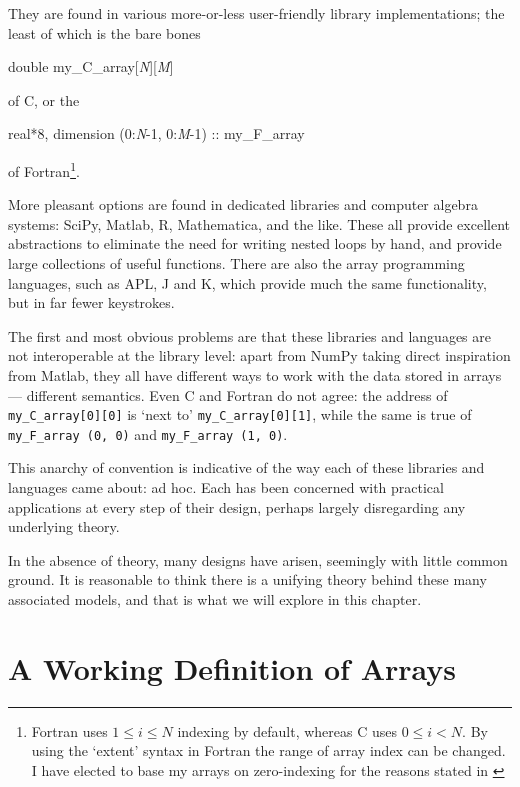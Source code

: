 \documentclass{DIKU-report-variant}
\begin{document}
They are found in various more-or-less user-friendly library implementations;
the least of which is the bare bones
\begin{center}
\ttfamily double my\_C\_array[\textit{N}][\textit{M}]
\end{center}
of C, or the
\begin{center}
\ttfamily real*8, dimension (0:\textit{N}-1, 0:\textit{M}-1) :: my\_F\_array
\end{center}
of Fortran\footnote{Fortran uses \(1\le i\le N\) indexing by default, whereas C uses \(0\le i<N\).
By using the `extent' syntax in Fortran the range of array index can be changed. I have elected
to base my arrays on zero-indexing for the reasons stated in \cite{EWD831}}.

More pleasant options are found in dedicated libraries and computer algebra systems: SciPy, Matlab,
R, Mathematica, and the like. These all provide excellent abstractions 
to eliminate the need for writing nested loops by hand, and provide
large collections of useful functions.
There are also the array programming languages, such as APL, J and K, which provide
much the same functionality, but in far fewer keystrokes.

The first and most obvious problems are that these libraries and languages are not interoperable
at the library level: apart from NumPy taking direct inspiration from Matlab, they
all have different ways to work with the data stored in arrays --- different semantics.
Even C and Fortran do not agree: the address of \texttt{my\_C\_array[0][0]} is `next
to' \texttt{my\_C\_array[0][1]}, while the same is true of \texttt{my\_F\_array (0, 0)}
and \texttt{my\_F\_array (1, 0)}.

This anarchy of convention is indicative of the way each of these libraries and
languages came about: ad hoc. Each has been concerned with practical applications
at every step of their design, perhaps largely disregarding any underlying theory.

In the absence of theory, many designs have arisen, seemingly with little common
ground. It is reasonable to think there is a unifying theory behind these many associated
models, and that is what we will explore in this chapter.

\section{A Working Definition of Arrays}
\end{document}
